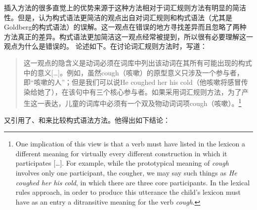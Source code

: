     插入方法的很多直觉上的优势来源于这种方法相对于词汇规则方法有明显的简洁性。但是，认为构式语法更简洁的观点出自对词汇规则和构式语法（尤其是Goldberg\citeyearpar{Goldberg95a,Goldberg2006a}的构式语法）的误解。这一观点在错误的地方寻找差异而且忽略了两种方法真正的差异。构式语法更加简洁这一观点经常被提到，所以很有必要理解这一观点为什么是错误的。
    \citet{Tomasello2003a}论述如下。在讨论词汇规则方法时，\citet[]{Tomasello2003a}写道：   

\begin{quote}
这一观点的隐含义是动词必须在词库中列出该动词在其所有可能出现的构式中的意义[\ldots]。例如，虽然cough（咳嗽）的原型意义只涉及一个参与者，即“咳嗽的人”；但是我们可以说He coughed her his cold（他咳嗽将感冒传染给她了），在该句中有三个核心参与者。如果采用词汇规则方法，为了产生这一表达，儿童的词库中必须有一个双及物动词词项cough（咳嗽）。\citep[]{Tomasello2003a}\footnote{%
One implication of this view is that a verb must have listed in the lexicon a different meaning for
virtually every different construction in which it participates [\ldots].  For example, while the
prototypical meaning of \emph{cough} involves only one participant, the cougher, we may say such
things as \emph{He coughed her his cold}, in which there are three core participants.  In the
lexical rules approach, in order to produce this utterance the child's lexicon must have as an entry
a ditransitive meaning for the verb \emph{cough}.
}
\end{quote}
\citet[]{Tomasello2003a}又引用了\citet{FKoC88a}、\citet{Goldberg95a}和\citet{Croft2001a}来比较构式语法方法。他得出如下结论：

